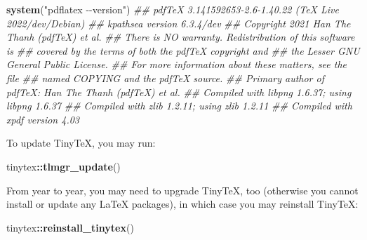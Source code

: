 \documentclass[
  12pt,
]{book}
\newenvironment{Shaded}{\begin{snugshade}}{\end{snugshade}}
\newcommand{\CommentTok}[1]{\textcolor[rgb]{0.56,0.35,0.01}{\textit{#1}}}
\newcommand{\KeywordTok}[1]{\textcolor[rgb]{0.13,0.29,0.53}{\textbf{#1}}}
\newcommand{\NormalTok}[1]{#1}
\newcommand{\OperatorTok}[1]{\textcolor[rgb]{0.81,0.36,0.00}{\textbf{#1}}}
\newcommand{\StringTok}[1]{\textcolor[rgb]{0.31,0.60,0.02}{#1}}
\begin{document}
\begin{Shaded}
\begin{Highlighting}[]
\KeywordTok{system}\NormalTok{(}\StringTok{"pdflatex {-}{-}version"}\NormalTok{)}
\CommentTok{\#\# pdfTeX 3.141592653{-}2.6{-}1.40.22 (TeX Live 2022/dev/Debian)}
\CommentTok{\#\# kpathsea version 6.3.4/dev}
\CommentTok{\#\# Copyright 2021 Han The Thanh (pdfTeX) et al.}
\CommentTok{\#\# There is NO warranty.  Redistribution of this software is}
\CommentTok{\#\# covered by the terms of both the pdfTeX copyright and}
\CommentTok{\#\# the Lesser GNU General Public License.}
\CommentTok{\#\# For more information about these matters, see the file}
\CommentTok{\#\# named COPYING and the pdfTeX source.}
\CommentTok{\#\# Primary author of pdfTeX: Han The Thanh (pdfTeX) et al.}
\CommentTok{\#\# Compiled with libpng 1.6.37; using libpng 1.6.37}
\CommentTok{\#\# Compiled with zlib 1.2.11; using zlib 1.2.11}
\CommentTok{\#\# Compiled with xpdf version 4.03}
\end{Highlighting}
\end{Shaded}

To update TinyTeX, you may run:

\begin{Shaded}
\begin{Highlighting}[]
\NormalTok{tinytex}\OperatorTok{::}\KeywordTok{tlmgr\_update}\NormalTok{()}
\end{Highlighting}
\end{Shaded}

From year to year, you may need to upgrade TinyTeX, too (otherwise you cannot install or update any LaTeX packages), in which case you may reinstall TinyTeX:

\begin{Shaded}
\begin{Highlighting}[]
\NormalTok{tinytex}\OperatorTok{::}\KeywordTok{reinstall\_tinytex}\NormalTok{()}
\end{Highlighting}
\end{Shaded}


\printindex
\end{document}
